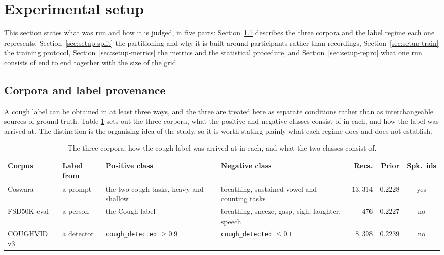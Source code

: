 \section{Experimental setup}\label{sec:setup}

This section states what was run and how it is judged, in five parts:
Section~\ref{sec:setup-corpora} describes the three corpora and the label regime each
one represents, Section~\ref{sec:setup-split} the partitioning and why it is built around
participants rather than recordings, Section~\ref{sec:setup-train} the training protocol,
Section~\ref{sec:setup-metrics} the metrics and the statistical procedure, and
Section~\ref{sec:setup-repro} what one run consists of end to end together with the size
of the grid.

\subsection{Corpora and label provenance}\label{sec:setup-corpora}

A cough label can be obtained in at least three ways, and the three are treated here as
separate conditions rather than as interchangeable sources of ground truth. Table
\ref{tab:corpora} sets out the three corpora, what the positive and negative classes
consist of in each, and how the label was arrived at. The distinction is the organising
idea of the study, so it is worth stating plainly what each regime does and does not
establish.

\begin{table}[tbp]
\caption{The three corpora, how the cough label was arrived at in each, and what the two classes consist of.}\label{tab:corpora}
\small
\begin{tabular}{@{}lp{}p{}p{}rrc@{}}
\toprule
Corpus & Label from & Positive class & Negative class & Recs. & Prior & Spk.\ ids \\
\midrule
Coswara & a prompt & the two cough tasks, heavy and shallow & breathing, sustained vowel
  and counting tasks & $13{,}314$ & $0.2228$ & yes \\
\addlinespace
FSD50K eval & a person & the \textsf{Cough} label & breathing, sneeze, gasp, sigh,
  laughter, speech & $476$ & $0.2227$ & no \\
\addlinespace
COUGHVID v3 & a detector & \texttt{cough\_detected} $\geq 0.9$ &
  \texttt{cough\_detected} $\leq 0.1$ & $8{,}398$ & $0.2239$ & no \\
\bottomrule
\end{tabular}
\end{table}

